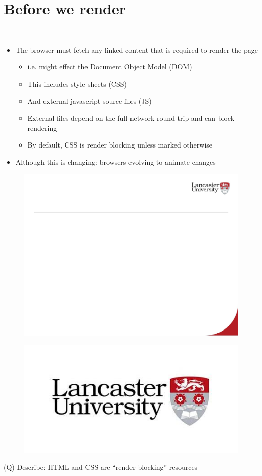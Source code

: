 \documentclass[12pt]{article}
\begin{document}
\section{Before we render}
\\
\begin{itemize}
  \item The browser must fetch any linked content that is required to render the page
\begin{itemize}
  \item i.e. might effect the Document Object Model (DOM)
  \item This includes style sheets (CSS)
  \item And external javascript source files (JS)
  \item External files depend on the full network round trip and can block rendering
  \item By default, CSS is render blocking unless marked otherwise
\end{itemize}
  \item Although this is changing: browsers evolving to animate changes
\end{itemize}
\begin{figure}[H]
\includegraphics[width=0.5\linewidth]{page45-image-1.png}
\end{figure}
\begin{figure}[H]
\includegraphics[width=0.5\linewidth]{page45-image-2.png}
\end{figure}
\clearpage
(Q)
Describe: HTML and CSS are “render blocking” resources
\clearpage
\end{document}
